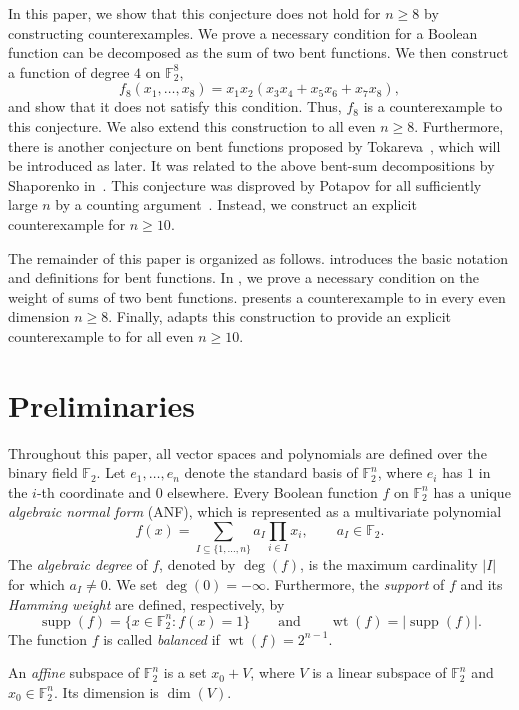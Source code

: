 \documentclass{amsart}
\numberwithin{equation}{section}
\theoremstyle{plain}
\theoremstyle{definition}
\theoremstyle{remark}
\DeclareMathOperator{\wt}{wt}
\DeclareMathOperator{\supp}{supp}
\newcommand{\F}{\mathbb{F}_2}
\begin{document}
In this paper, we show that this conjecture does not hold for $n\geq 8$ by constructing counterexamples. We prove a necessary condition for a Boolean function can be decomposed as the sum of two bent functions. We then construct a function of degree $4$ on $\F^8$,
\[
 f_8(x_1,\ldots,x_8)
  =x_1x_2(x_3x_4+x_5x_6+x_7x_8),
\]
and show that it does not satisfy this condition. Thus, $f_8$ is a counterexample to this conjecture. We also extend this construction to all even $n\geq 8$. Furthermore, there is another conjecture on bent functions proposed by Tokareva~\cite{tokareva2016}, which will be introduced as  later. It was related to the above bent-sum decompositions by Shaporenko in~\cite{shaporenko2023}. This conjecture was disproved by Potapov for all sufficiently large $n$ by a counting argument~\cite{potapov2023}. Instead, we construct
an explicit counterexample for $n\geq 10$.

The remainder of this paper is organized as follows.  introduces the basic notation and definitions for bent functions. In , we prove a necessary condition on the weight of sums of two bent functions.  presents a counterexample to  in every even dimension $n\ge 8$. Finally,  adapts this construction to provide an explicit counterexample to  for all even $n\ge 10$.


\section{Preliminaries}
\label{sec:pre}
Throughout this paper, all vector spaces and polynomials are defined over the binary field $\F$. Let $e_1,\ldots,e_n$ denote the standard basis of $\F^n$, where $e_i$
has $1$ in the $i$-th coordinate and $0$ elsewhere. Every Boolean function $f$ on $\F^n$ has
a unique \emph{algebraic normal form} (ANF), which is represented as a multivariate polynomial
\[
 f(x)=\sum_{I\subseteq\{1,\ldots,n\}}a_I\prod_{i\in I}x_i,
 \qquad a_I\in\F.
\]
The \emph{algebraic degree} of $f$, denoted by $\deg(f)$, is the maximum cardinality $|I|$ for which $a_I\ne 0$. We set $\deg(0)=-\infty$. Furthermore, the \emph{support} of $f$ and its \emph{Hamming weight} are defined, respectively, by
\[
 \supp(f)=\{x\in\F^n:f(x)=1\} \qquad \text{and} \qquad \wt(f)=|\supp(f)|.
\]
The function $f$ is called \emph{balanced} if $\wt(f)=2^{n-1}$.

An \emph{affine} subspace of $\F^n$ is a set $x_0+V$, where $V$ is a linear
subspace of $\F^n$ and $x_0\in\F^n$. Its dimension is $\dim(V)$.
\end{document}
